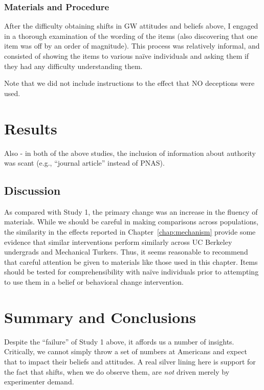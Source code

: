 \subsubsection{Materials and Procedure}

After the difficulty obtaining shifts in GW attitudes and beliefs above, I
engaged in a thorough examination of the wording of the items (also discovering
that one item was off by an order of magnitude). This process was relatively
informal, and consisted of showing the items to various naïve individuals and
asking them if they had any difficulty understanding them.

Note that we did not include instructions to the effect that NO deceptions were
used.

\section{Results}


Also - in both of the above studies, the inclusion of information about
authority was scant (e.g., “journal article” instead of PNAS).

\subsection{Discussion}

As compared with Study 1, the primary change was an increase in the fluency of
materials. While we should be careful in making comparisons across populations,
the similarity in the effects reported in Chapter~\ref{chap:mechanism} provide
some evidence that similar interventions perform similarly across UC Berkeley
undergrads and Mechanical Turkers. Thus, it seems reasonable to recommend that
careful attention be given to materials like those used in this chapter. Items
should be tested for comprehensibility with naïve individuals prior to
attempting to use them in a belief or behavioral change intervention.

\section{Summary and Conclusions}

Despite the “failure” of Study 1 above, it affords us a number of insights.
Critically, we cannot simply throw a set of numbers at Americans and expect that
to impact their beliefs and attitudes. A real silver lining here is
support for the fact that shifts, when we do observe them, are \emph{not} driven
merely by experimenter demand.
